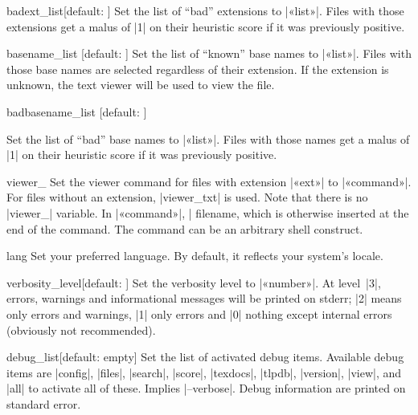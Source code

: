 \documentclass[draft]{texdoc-doc}
\begin{document}
\begin{confitem}{badext\_list}{}[default: ]
Set the list of ``bad'' extensions to |«list»|. Files with those extensions get
a malus of |1| on their heuristic score if it was previously positive.
\end{confitem}

\begin{confitem}{basename\_list}
  {}[default: ]
Set the list of ``known'' base names to |«list»|. Files with those base names
are selected regardless of their extension. If the extension is unknown, the
text viewer will be used to view the file.
\end{confitem}

\begin{confitem}{badbasename\_list}
  {}[default: ]

Set the list of ``bad'' base names to |«list»|. Files with those names get a
malus of |1| on their heuristic score if it was previously positive.
\end{confitem}

\begin{confitem}{viewer\_}{}
Set the viewer command for files with extension |«ext»| to |«command»|. For
files without an extension, |viewer_txt| is used. Note that there is no
|viewer_| variable. In |«command»|, |%
filename, which is otherwise inserted at the end of the command. The command
can be an arbitrary shell construct.
\end{confitem}

\begin{confitem}{lang}{}
Set your preferred language. By default, it reflects your system's locale.
\end{confitem}

\begin{confitem}{verbosity\_level}{}[default: ]
Set the verbosity level to |«number»|. At level~|3|, errors, warnings and
informational messages will be printed on stderr; |2| means only errors and
warnings, |1| only errors and |0| nothing except internal errors (obviously not
recommended).
\end{confitem}

\begin{confitem}{debug\_list}{}[default: empty]
Set the list of activated debug items. Available debug items are |config|,
|files|, |search|, |score|, |texdocs|, |tlpdb|, |version|, |view|, and |all| to
activate all of these. Implies |--verbose|. Debug information are printed on
standard error.
\end{confitem}
\end{document}
